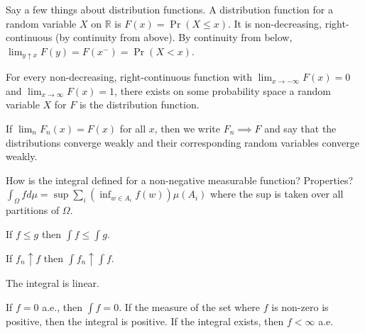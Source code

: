 \documentclass[avery5388,grid,frame]{flashcards}
\newcommand{\R}{\mathbb{R}}
\begin{document}
\begin{flashcard}
    {Say a few things about distribution functions.}
    A distribution function for a random variable $X$ on $\R$ is $F(x) = \Pr(X \leq x)$. It is non-decreasing, right-continuous (by continuity from above). By continuity from below, $\lim_{y \uparrow x} F(y) = F(x^-) = \Pr(X < x)$.

    For every non-decreasing, right-continuous function with $\lim_{x \rightarrow -\infty} F(x) = 0$ and $\lim_{x \rightarrow \infty} F(x) = 1$, there exists on some probability space a random variable $X$ for $F$ is the distribution function.

    If $\lim_n F_n(x) = F(x)$ for all $x$, then we write $F_n \implies F$ and say that the distributions converge weakly and their corresponding random variables converge weakly.
\end{flashcard}


\begin{flashcard}
    {How is the integral defined for a non-negative measurable function? Properties?}
    $\int_\Omega f d\mu = \sup \sum_i (\inf_{w \in A_i} f(w)) \mu(A_i)$ where the sup is taken over all partitions of $\Omega$.

    If $f \leq g$ then $\int f \leq \int g$.

    If $f_n \uparrow f$ then $\int f_n \uparrow \int f$.

    The integral is linear.

    If $f = 0$ a.e., then $\int f = 0$. If the measure of the set where $f$ is non-zero is positive, then the integral is positive. If the integral exists, then $f < \infty$ a.e. 
\end{flashcard}


\begin{flashcard}
    {}
\end{flashcard}
\end{document}
